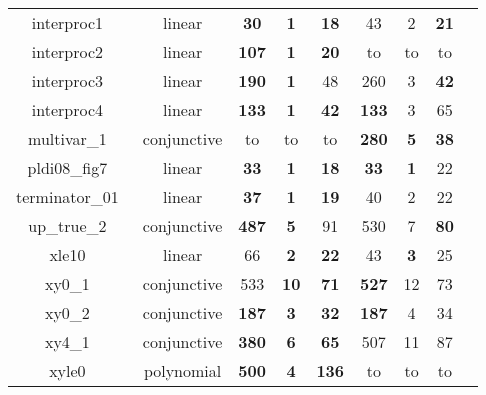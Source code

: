 \begin{table}[t]
\begin{tabular}{l c | c c c | c c c | c }
\multicolumn{1}{|c|}{interproc1~\cite{jeannet2010interproc}}		&linear 			& \textbf{30} & \textbf{1} &\textbf{18}	& 43 & 2  &\textbf{21}		&\multicolumn{1}{|c|}{\cmark} \\
\multicolumn{1}{|c|}{interproc2~\cite{jeannet2010interproc}}		&linear 			& \textbf{107} & \textbf{1} &\textbf{20}	& to & to & to	&\multicolumn{1}{|c|}{\cmark} \\
\multicolumn{1}{|c|}{interproc3~\cite{jeannet2010interproc}}		&linear 			& \textbf{190} & \textbf{1} & 48	& 260 & 3  & \textbf{42}	&\multicolumn{1}{|c|}{\cmark} \\
\multicolumn{1}{|c|}{interproc4~\cite{jeannet2010interproc}}		&linear 			& \textbf{133} & \textbf{1} &\textbf{42}	& \textbf{133} & 3  & 65	&\multicolumn{1}{|c|}{\cmark} \\
\multicolumn{1}{|c|}{multivar\_1~\cite{jeannet2010interproc}}		&conjunctive		& to & to & to & \textbf{280} & \textbf{5}  & \textbf{38}	&\multicolumn{1}{|c|}{\cmark} \\
\multicolumn{1}{|c|}{pldi08\_fig7~\cite{gulavani2008automatically}}		&linear 			& \textbf{33} & \textbf{1} &\textbf{18}	& \textbf{33} & \textbf{1} & 22		&\multicolumn{1}{|c|}{\cmark} \\
\multicolumn{1}{|c|}{terminator\_01~\cite{beyer:SVCOMP:2013}}	&linear 			&\textbf{37} & \textbf{1} &\textbf{19}	& 40 & 2  & 22		&\multicolumn{1}{|c|}{\cmark} \\
\multicolumn{1}{|c|}{up\_true\_2~\cite{Dirk:SVCOMP:2016}}		&conjunctive		& \textbf{487} & \textbf{5} & 91 & 530 & 7 & \textbf{80}	&\multicolumn{1}{|c|}{\cmark} \\
\multicolumn{1}{|c|}{xle10~\cite{}}				&linear 			&66 & \textbf{2} &\textbf{22}	&43 &\textbf{3}  &25		&\multicolumn{1}{|c|}{\cmark} \\
\multicolumn{1}{|c|}{xy0\_1~\cite{sharma2012interpolants}}			&conjunctive		&533 & \textbf{10} &\textbf{71}	& \textbf{527} & 12  & 73	&\multicolumn{1}{|c|}{\cmark} \\
\multicolumn{1}{|c|}{xy0\_2~\cite{sharma2012interpolants}}			&conjunctive		& \textbf{187} & \textbf{3} &\textbf{32}	& \textbf{187} & 4  & 34 &\multicolumn{1}{|c|}{\cmark} \\
\multicolumn{1}{|c|}{xy4\_1~\cite{sharma2012interpolants}}			&conjunctive		& \textbf{380} & \textbf{6} &\textbf{65}	& 507 & 11 & 87	&\multicolumn{1}{|c|}{\cmark} \\
\multicolumn{1}{|c|}{xyle0~\cite{sharma2012interpolants}}				&polynomial 		& \textbf{500} & \textbf{4} &\textbf{136} & to & to & to &\multicolumn{1}{|c|}{\cmark} \\

\end{tabular}
\end{table}
